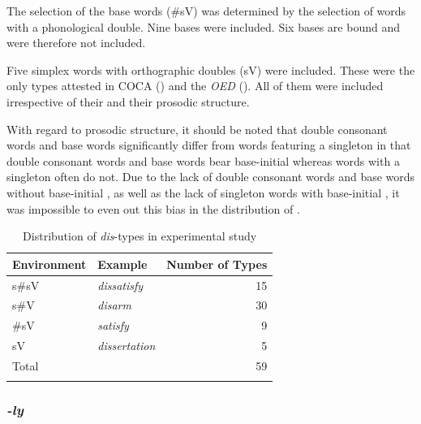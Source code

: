 The selection of the base words (\#sV) was determined by the selection of words with a phonological double. 
Nine bases were included. Six bases are bound and were therefore not included. 

Five simplex words with orthographic doubles (sV) were included. These were the only types attested in  {COCA} (\citealt{Davies.20082014}) and the \textit{OED} (\citealt{OED.2013}). 
All of them were included irrespective of their  and their prosodic structure. 

With regard to prosodic structure, it should be noted that double consonant words and base words significantly differ from words featuring a singleton in that double consonant words and base words bear base-initial  whereas words with a singleton often do not. Due to the lack of double consonant words and base words without base-initial , as well as the lack of singleton words with base-initial , it was impossible to even out this bias in the distribution of .


\begin{table}[h!]
	\caption{Distribution of \textit{dis}-types in experimental study}
	\label{tbl:distribution of dis types in experiment}

	
		\begin{tabular} {llr}
\lsptoprule
			Environment & Example & Number of  Types\\

			\midrule
			s\#sV&\textit{dissatisfy} & 15 \\ 
			s\#V&\textit{disarm} & 30\\ 
			\#sV&\textit{satisfy} & 9\\ 
			sV&\textit{dissertation} & 5 \\ 
			\midrule   	
			Total&  & 59\\ 
			\lspbottomrule                                                                                
		\end{tabular}
	
\end{table}



\subsubsection{\textit{-ly}} \label{stimuli ly}


